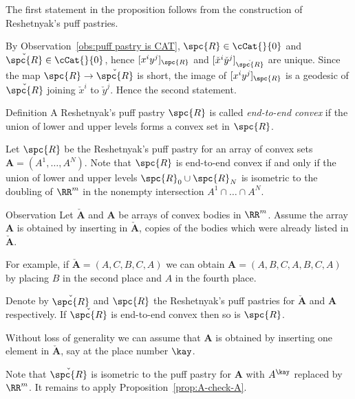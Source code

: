 The first statement in the proposition 
follows from the construction of Reshetnyak's  puff pastries.

	By Observation~\ref{obs:puff pastry is CAT}, $\spc{R}\in\cCat{}{0}$ and  $\check{\spc{R}}\in\cCat{}{0}$, hence $[x^i y^j]_{\spc{R}}$ and $[\check x^i \check y^j]_{\check{\spc{R}}}$ 
 are unique.  Since the map $\spc{R}\to\check{\spc{R}}$ is short, the image of $[x^i y^j]_{\spc{R}}$
is a geodesic of $\check{\spc{R}}$ joining $\check x^i$ to $\check y^j$.
Hence the second statement.
\qeds

\begin{thm}{Definition}
A Reshetnyak's puff pastry $\spc{R}$ 
is called \emph{end-to-end convex} 
if the union of lower and upper levels 
forms a convex set in $\spc{R}$.
\end{thm}

Let $\spc{R}$ be the Reshetnyak's puff pastry for an array of convex sets $\bm{A}=(A^{1},\dots, A^{N})$.
Note that $\spc{R}$ is end-to-end convex
if and only if the union of lower and upper levels
$\spc{R}_0\cup\spc{R}_N$ is isometric to the doubling of $\RR^m$ in the nonempty intersection $A^1\cap\dots\cap A^N$.


\begin{thm}{Observation}\label{obs:end-to-end-convex}
Let $\check{\bm{A}}$ and $\bm{A}$ be arrays of convex bodies in $\RR^m$.
Assume 
the  array $\bm{A}$ is
obtained by inserting in $\check{\bm{A}}$, 
copies of the bodies which were already listed in $\check{\bm{A}}$.

For example, if $\check{\bm{A}}=(A,C,B,C,A)$ we can obtain $\bm{A}=(A,B,C,A,B,C,A)$
by placing $B$ in the second place and $A$ in the fourth place.

Denote by $\check{\spc{R}}$ and $\spc{R}$ 
the Reshetnyak's puff pastries for $\check{\bm{A}}$ and $\bm{A}$ respectively.
If $\check{\spc{R}}$ is end-to-end convex then so is $\spc{R}$.
\end{thm}

Without loss of generality we can assume that $\bm{A}$ is 
obtained by inserting one element in $\check{\bm{A}}$,
say at the place number $\kay$.

Note that $\check{\spc{R}}$ is isometric to the puff pastry 
for $\bm{A}$ with $A^\kay$ replaced by $\RR^m$.
It remains to apply Proposition~\ref{prop:A-check-A}.
\qeds

